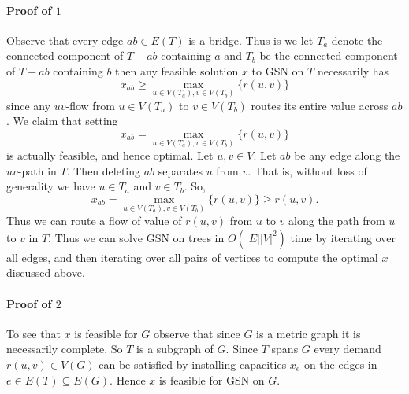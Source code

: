 \documentclass[letterpaper,12pt,oneside,onecolumn]{article}
\begin{document}
\paragraph{Proof of $1$}
Observe that every edge $ab \in E(T)$ is a bridge. Thus is we let $T_a$ denote the connected component of $T-ab$ containing $a$ and $T_b$ be the connected component of $T-ab$ containing $b$ then any feasible solution $x$ to GSN on $T$ necessarily has
$$x_{ab} \geq \max_{u \in V(T_a), v \in V(T_b)} \{r(u,v)\}$$
since any $uv$-flow from $u\in V(T_a)$ to $v \in V(T_b)$ routes its entire value across $ab$. We claim that setting
$$x_{ab} = \max_{u \in V(T_a), v\in V(T_b)} \{r(u,v)\}$$
is actually feasible, and hence optimal. Let $u,v \in V$. Let $ab$ be any edge along the $uv$-path in $T$. Then deleting $ab$ separates $u$ from $v$. That is, without loss  of generality we have $u \in T_a$ and $v \in T_b$. So,
$$x_{ab} = \max_{u \in V(T_a), v\in V(T_b)} \{r(u,v)\} \geq r(u,v).$$
Thus we can route a flow of value of $r(u,v)$ from $u$ to $v$ along the path from $u$ to $v$ in $T$. Thus we can solve GSN on trees in $O(|E| |V|^2)$ time by iterating over all edges, and then iterating over all pairs of vertices to compute the optimal $x$ discussed above.
\paragraph{Proof of $2$}
To see that $x$ is feasible for $G$ observe that since $G$ is a metric graph it is necessarily complete. So $T$ is a subgraph of $G$. Since $T$ spans $G$ every demand $r(u,v) \in V(G)$ can be satisfied by installing capacities $x_e$ on the edges in $e\in E(T) \subseteq E(G)$. Hence $x$ is feasible for GSN on $G$.
\end{document}
